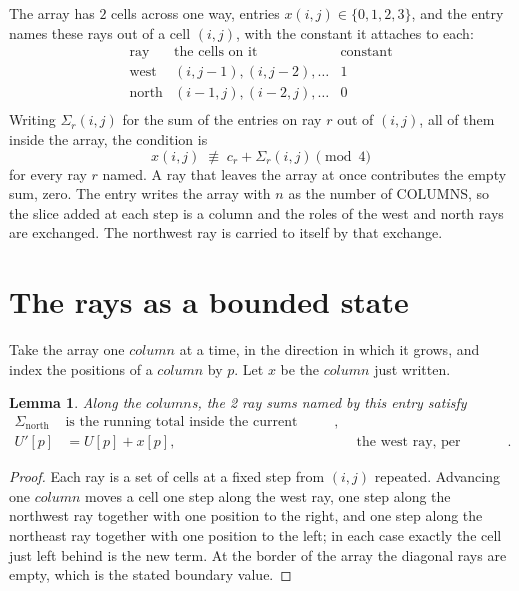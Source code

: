 \documentclass[11pt,a4paper]{article}
\theoremstyle{plain}
\newtheorem{lemma}[theorem]{Lemma}
\theoremstyle{definition}
\begin{document}
The array has $2$ cells across one way, entries $x(i,j)\in\{0,1,2,3\}$, and the entry names these
rays out of a cell $(i,j)$, with the constant it attaches to each:
\[
\begin{array}{lll}
\text{ray} & \text{the cells on it} & \text{constant} \\[2pt]
\text{west} & (i,j-1),(i,j-2),\dots & 1 \\
\text{north} & (i-1,j),(i-2,j),\dots & 0 \\
\end{array}
\]
Writing $\Sigma_r(i,j)$ for the sum of the entries on ray $r$ out of $(i,j)$, all of them
inside the array, the condition is
\[
x(i,j)\;\not\equiv\;c_r+\Sigma_r(i,j) \pmod{4}
\]
for every ray $r$ named. A ray that leaves the array at once contributes the empty sum,
zero. The entry writes the array with $n$ as the number of COLUMNS, so the slice added at each step is a column and the roles of the west and north rays are exchanged. The northwest ray is carried to itself by that exchange.

\section{The rays as a bounded state}

Take the array one $column$ at a time, in the direction in which it grows, and index the
positions of a $column $ by $p$. Let $x$ be the $column$ just written.

\begin{lemma}\label{lem:rays}
Along the $column$s, the 2 ray sums named by this entry satisfy
\[
\begin{aligned}
\Sigma_{\mathrm{north}}\ &\text{is the running total inside the current column},\\
U'[p]&=U[p]+x[p], &&\text{the west ray, per position} .
\end{aligned}
\]
\end{lemma}

\begin{proof}
Each ray is a set of cells at a fixed step from $(i,j)$ repeated. Advancing one $column$
moves a cell one step along the west ray, one step along the northwest ray together with one
position to the right, and one step along the northeast ray together with one position to the
left; in each case exactly the cell just left behind is the new term. At the border of the
array the diagonal rays are empty, which is the stated boundary value.
\end{proof}
\end{document}
